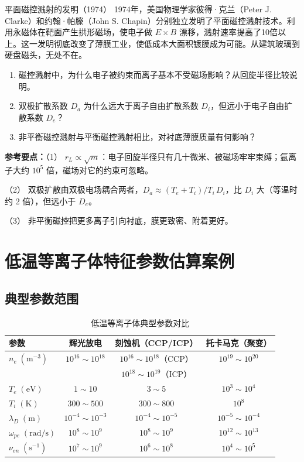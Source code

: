\documentclass[12pt,a4paper,openany,oneside]{book}
\newcommand{\quizans}[1]{\par\medskip{\color{figGray}\rule{\linewidth}{0.3pt}}\par\smallskip
  {\footnotesize\textbf{参考要点：}#1}}
\begin{document}
\begin{history}{平面磁控溅射的发明（1974）}{}
1974年，美国物理学家彼得·克兰（Peter J. Clarke）和约翰·帕滕（John S. Chapin）分别独立发明了平面磁控溅射技术。利用永磁体在靶面产生拱形磁场，使电子做 $E\times B$ 漂移，溅射速率提高了10倍以上。这一发明彻底改变了薄膜工业，使低成本大面积镀膜成为可能。从建筑玻璃到硬盘磁头，无处不在。
\end{history}

\begin{miniquiz}
\begin{enumerate}
\item 磁控溅射中，为什么电子被约束而离子基本不受磁场影响？从回旋半径比较说明。
\item 双极扩散系数 $D_a$ 为什么远大于离子自由扩散系数 $D_i$，但远小于电子自由扩散系数 $D_e$？
\item 非平衡磁控溅射与平衡磁控溅射相比，对衬底薄膜质量有何影响？
\end{enumerate}
\quizans{（1） $r_L\propto\sqrt m$：电子回旋半径只有几十微米、被磁场牢牢束缚；氩离子大约 $10^5$ 倍，磁场对它的约束可忽略。\par （2） 双极扩散由双极电场耦合两者，$D_a\approx(T_e+T_i)/T_i\,D_i$，比 $D_i$ 大（等温时约 2 倍），但远小于 $D_e$。\par （3） 非平衡磁控把更多离子引向衬底，膜更致密、附着更好。}
\end{miniquiz}

\section{低温等离子体特征参数估算案例}

\subsection{典型参数范围}

\begin{table}[htbp]
\centering
\caption{低温等离子体典型参数对比}
\label{tab:plasma-params}
\begin{tabular}{lccc}
\toprule
\textbf{参数} & \textbf{辉光放电} & \textbf{刻蚀机（CCP/ICP）} & \textbf{托卡马克（聚变）} \\
\midrule
$n_e\;(\mathrm{m^{-3}})$ & $10^{16}\sim 10^{18}$ & $10^{16}\sim 10^{18}$（CCP）& $10^{19}\sim 10^{20}$ \\
& & $10^{18}\sim 10^{19}$（ICP）& \\
$T_e\;(\mathrm{eV})$ & $1\sim 10$ & $3\sim 5$ & $10^3\sim 10^4$ \\
$T_i\;(\mathrm{K})$ & $300\sim 500$ & $300\sim 800$ & $10^8$ \\
$\lambda_D\;(\mathrm{m})$ & $10^{-4}\sim 10^{-3}$ & $10^{-4}\sim 10^{-5}$ & $10^{-5}\sim 10^{-4}$ \\
$\omega_{pe}\;(\mathrm{rad/s})$ & $10^8\sim 10^9$ & $10^8\sim 10^9$ & $10^{12}\sim 10^{13}$ \\
$\nu_{en}\;(\mathrm{s^{-1}})$ & $10^7\sim 10^9$ & $10^6\sim 10^8$ & $10^4\sim 10^5$ \\
\bottomrule
\end{tabular}
\end{table}
\end{document}
